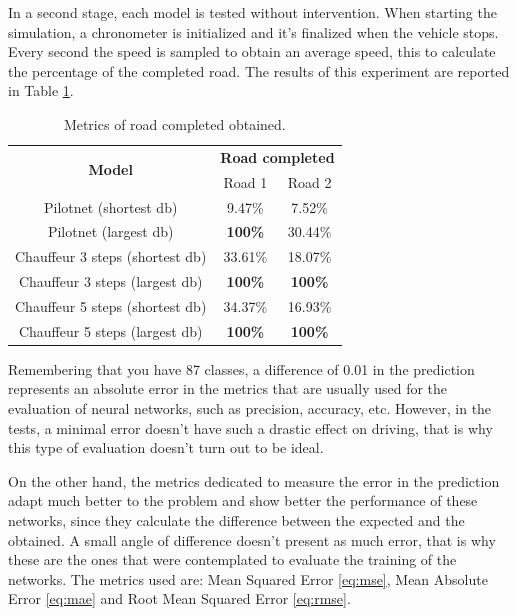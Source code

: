 \documentclass[conference]{IEEEtran}
\begin{document}
In a second stage, each model is tested without intervention. When starting the simulation, a chronometer is initialized and it's finalized when the vehicle stops. Every second the speed is sampled to obtain an average speed, this to calculate the percentage of the completed road. The results of this experiment are reported in Table \ref{table:read}.

\begin{table}[H]
	\caption{Metrics of road completed obtained.}
	\begin{center}
		\begin{tabular}{|c|c|c|}
			\hline
			\multirow{2}{*}{\textbf{Model}} & \multicolumn{2}{|c|}{\textbf{Road completed}} \\\cline{2-3} 
			& Road 1 & Road 2 \\\hline \hline
			
			Pilotnet (shortest db) & 9.47\% & 7.52\% \\\hline
			Pilotnet (largest db) & \textbf{100\%} & 30.44\% \\\hline
			Chauffeur 3 steps (shortest db) & 33.61\% & 18.07\% \\\hline
			Chauffeur 3 steps (largest db) & \textbf{100\%} & \textbf{100\%} \\\hline
			Chauffeur 5 steps (shortest db) & 34.37\% & 16.93\% \\\hline
			Chauffeur 5 steps (largest db) & \textbf{100\%} & \textbf{100\%} \\\hline
		\end{tabular}
		\label{table:read}
	\end{center}
\end{table}


Remembering that you have 87 classes, a difference of 0.01 in the prediction represents an absolute error in the metrics that are usually used for the evaluation of neural networks, such as precision, accuracy, etc. However, in the tests, a minimal error doesn't have such a drastic effect on driving, that is why this type of evaluation doesn't turn out to be ideal.

On the other hand, the metrics dedicated to measure the error in the prediction adapt much better to the problem and show better the performance of these networks, since they calculate the difference between the expected and the obtained. A small angle of difference doesn't present as much error, that is why these are the ones that were contemplated to evaluate the training of the networks. The metrics used are: Mean Squared Error \eqref{eq:mse}, Mean Absolute Error \eqref{eq:mae} and Root Mean Squared Error \eqref{eq:rmse}.
\end{document}
